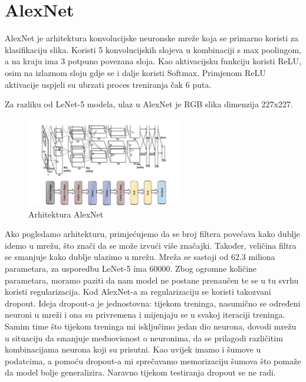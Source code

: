 \section{AlexNet}\label{sec:alexnet}
AlexNet je arhitektura konvolucijske neuronske mreže koja se primarno koristi za klasifikaciju slika. Koristi 5 konvolucijskih slojeva u kombinaciji s max poolingom, a na kraju ima 3 potpuno povezana sloja. Kao aktivacijsku funkciju koristi ReLU, osim na izlaznom sloju gdje se i dalje koristi Softmax. Primjenom ReLU aktivacije uspjeli su ubrzati proces treniranja čak 6 puta.

Za razliku od LeNet-5 modela, ulaz u AlexNet je RGB slika dimenzija 227x227.
\FloatBarrier
\begin{figure}[h]
    \centering
    \includegraphics[width=0.6\textwidth]{images/AlexNet}
    \caption{Arhitektura AlexNet
    \protect\footnotemark}
    \label{fig:slika9}
\end{figure}
\FloatBarrier
{}

Ako pogledamo arhitekturu, primjećujemo da se broj filtera povećava kako dublje idemo u mrežu, što znači da se može izvući više značajki.
Također, veličina filtra se smanjuje kako dublje ulazimo u mrežu.
Mreža se sastoji od 62.3 miliona parametara, za usporedbu LeNet-5 ima 60000.
Zbog ogromne količine parametara, moramo paziti da nam model ne postane prenaučen te se u tu svrhu koristi regularizacija.
Kod AlexNet-a za regularizaciju se koristi takozvani dropout.
Ideja dropout-a je jednostovna: tijekom treninga, nasumično se  određeni neuroni u mreži i ona su privremena i mijenjaju se u svakoj iteraciji treninga.
Samim time što tijekom treninga mi isključimo jedan dio neurona, dovodi mrežu u situaciju da smanjuje međuovisnost o neuronima, da se prilagodi različitim kombinacijama neurona koji su prisutni.
Kao uvijek imamo i šumove u podatcima, a pomoću dropout-a mi sprečavamo memorizaciju šumova što pomaže da model bolje generalizira.
Naravno tijekom testiranja dropout se ne radi.

